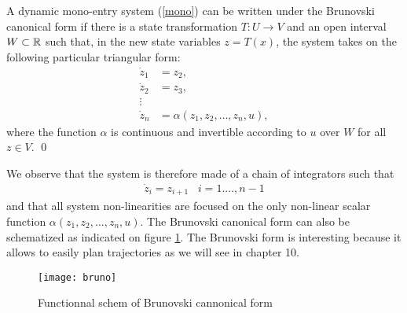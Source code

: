\begin{definition}{\blanc}

A dynamic mono-entry system (\ref{mono}) can be written under the Brunovski canonical form if there is a state transformation $ T : U \rightarrow V$ and an open interval $W \subset \mathbb{R}$ 
  such that, in the new state variables $z=T(x)$, the system takes on the following particular triangular form:
 \begin{equation*} \begin{split}
 \dot z_1 &= z_2,\\
 \dot z_2 &= z_3,\\
 \vdots &\\
 \dot z_n &= \alpha (z_1, z_2, \ldots, z_n, u),
\end{split} \end{equation*}
where the function $\alpha$ is continuous and invertible according to $u$ over $W$ for all $z \in V$.
\qed
\end{definition}

 We observe that the system is therefore made of a chain of integrators such that
 \begin{equation*} \begin{split}
 \dot z_i = z_{i+1}\;\;\; i = 1. \ldots, n-1
 \end{split} \end{equation*}
 and that all system non-linearities are focused on the only non-linear scalar function $\alpha (z_1, z_2, \ldots, z_n, u)$.  The Brunovski canonical form can also be schematized as indicated on figure \ref{Fig:bruno}. The Brunovski form is interesting because it allows to easily plan trajectories as we will see in chapter 10.
  \begin{figure}[htbp] 
    \centering
    \texttt{[image: bruno]} 
    \caption{Functionnal schem of Brunovski cannonical form}
    \label{Fig:bruno}
 \end{figure}
 
